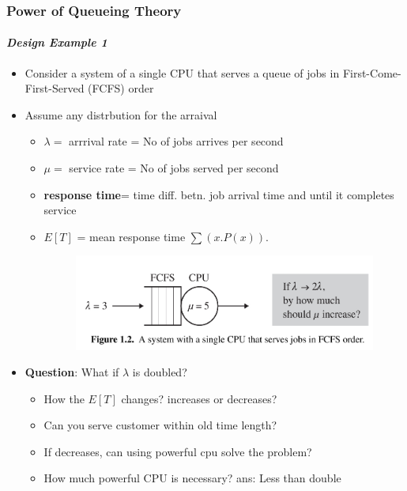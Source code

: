 \documentclass{beamer}
\begin{document}
\begin{frame}
    \frametitle{Power of Queueing Theory}
    \framesubtitle{\textbf{\textit{Design Example 1}}}
	\begin{itemize}
		\item Consider a  system  of a single CPU that serves a queue of jobs in First-Come- 								First-Served (FCFS) order
		\item Assume any distrbution for the arraival 
		\begin{itemize}
			\item $\lambda = $ arrrival rate = No of jobs arrives per second
			\item $\mu = $ service rate  = No of jobs served per second
			\item \textbf{response time}= time diff. betn. job arrival time and  				until it completes service
			\item $E[T]$ = mean response time $\sum(x. P(x))$. 
			\begin{figure}
        		\begin{center}
		            \includegraphics[scale=0.12]{images/simplequeue.jpg}
        		\end{center}
		    \end{figure}
		\end{itemize}
		\item \textbf{Question}: What if $\lambda  $ is doubled? 
			\begin{itemize}
			\item How the $E[T]$ changes? increases or decreases? 
			\item Can you serve customer within old	time length?
			\item If decreases, can using powerful cpu solve the problem?
			\item How much powerful CPU is necessary? ans: Less than double
			\end{itemize}
	\end{itemize}	    
    
\end{frame}
\end{document}
